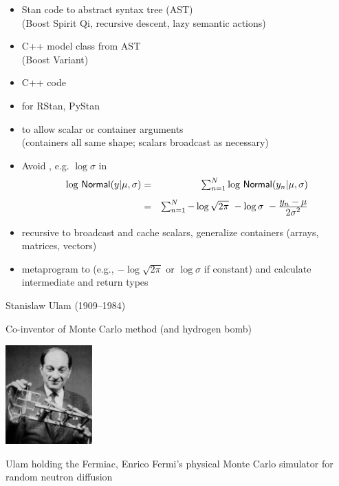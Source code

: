 \documentclass[10pt]{report}
\begin{document}
\begin{itemize}
\item Stan code  to abstract syntax tree (AST)
  \\ {\footnotesize (Boost Spirit Qi, recursive descent, lazy semantic
    actions)}
\item C++ model class  from AST
  \\ {\footnotesize (Boost Variant)}
\item C++ code 
\item {} for RStan, PyStan
\end{itemize}

\begin{itemize}
\item {} to allow scalar or container arguments
  \\ {\footnotesize (containers all same shape; scalars broadcast as necessary)}
\item Avoid , e.g. $\log \sigma$ in
  \hspace*{-18pt}
  {\small
    \begin{eqnarray*}
      \textstyle \log \, \mbox{\sf Normal}(y | \mu, \sigma)
      & = & \textstyle \sum_{n=1}^N \log \, \mbox{\sf Normal}(y_n | \mu,\sigma)
      \\[4pt]
      & = & \textstyle \sum_{n=1}^N  - \log \sqrt{2\pi} \ - \log \sigma \ -
      \frac{\textstyle y_n - \mu}{\textstyle 2\sigma^2}
    \end{eqnarray*}
  }
\item recursive  to broadcast and cache scalars,
  generalize containers (arrays, matrices, vectors)
\item {} metaprogram to  (e.g., $-\log
  \sqrt{2 \pi}$ or $\log \sigma$ if constant) 
  and calculate intermediate and return types
\end{itemize}



\begin{itemize}
\item Stanislaw Ulam (1909--1984)
\item Co-inventor of Monte Carlo method (and hydrogen bomb)
\item[]
  \begin{center}
    \includegraphics[width=0.25\textwidth]{img/ulam-fermiac.jpg}
  \end{center}
  {\small
  \item Ulam holding the Fermiac, Enrico Fermi's physical Monte Carlo simulator
    for random neutron diffusion}
\end{itemize}
\end{document}
